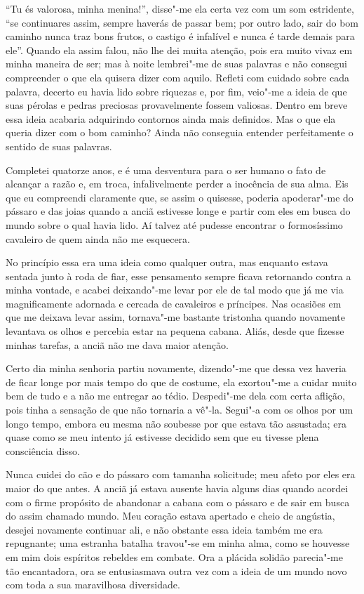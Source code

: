 ``Tu és valorosa, minha menina!'', disse"-me ela certa vez com um
som estridente, ``se continuares assim, sempre haverás de passar
bem; por outro lado, sair do bom caminho nunca traz bons frutos, o
castigo é infalível e nunca é tarde demais para ele''. Quando ela assim
falou, não lhe dei muita atenção, pois era muito vivaz em minha maneira
de ser; mas à noite lembrei"-me de suas palavras e não consegui
compreender o que ela quisera dizer com aquilo. Refleti com cuidado
sobre cada palavra, decerto eu havia lido sobre riquezas e, por fim,
veio"-me a ideia de que suas pérolas e pedras preciosas provavelmente
fossem valiosas. Dentro em breve essa ideia acabaria adquirindo
contornos ainda mais definidos. Mas o que ela queria dizer com o bom
caminho? Ainda não conseguia entender perfeitamente o sentido de suas
palavras.

 Completei quatorze anos, e é uma desventura para o ser humano o fato de
alcançar a razão e, em troca, infalivelmente perder a inocência de sua
alma. Eis que eu compreendi claramente que, se assim o quisesse,
poderia apoderar"-me do pássaro e das joias quando a anciã estivesse
longe e partir com eles em busca do mundo sobre o qual havia lido. Aí
talvez até pudesse encontrar o formosíssimo cavaleiro de quem ainda não
me esquecera.

 No princípio essa era uma ideia como qualquer outra, mas enquanto
estava sentada junto à roda de fiar, esse pensamento sempre ficava
retornando contra a minha vontade, e acabei deixando"-me levar por ele
de tal modo que já me via magnificamente adornada e cercada de
cavaleiros e príncipes. Nas ocasiões em que me deixava levar assim,
tornava"-me bastante tristonha quando novamente levantava os olhos e
percebia estar na pequena cabana. Aliás, desde que fizesse minhas
tarefas, a anciã não me dava maior atenção.

 Certo dia minha senhoria partiu novamente, dizendo"-me que dessa vez
haveria de ficar longe por mais tempo do que de costume, ela exortou"-me
a cuidar muito bem de tudo e a não me entregar ao tédio. Despedi"-me
dela com certa aflição, pois tinha a sensação de que não tornaria a
vê"-la. Segui"-a com os olhos por um longo tempo, embora eu mesma não
soubesse por que estava tão assustada; era quase como se meu intento já
estivesse decidido sem que eu tivesse plena consciência disso.

 Nunca cuidei do cão e do pássaro com tamanha solicitude; meu afeto por
eles era maior do que antes. A anciã já estava ausente havia alguns
dias quando acordei com o firme propósito de abandonar a cabana com o
pássaro e de sair em busca do assim chamado mundo. Meu coração estava
apertado e cheio de angústia, desejei novamente continuar ali, e não
obstante essa ideia também me era repugnante; uma estranha batalha
travou"-se em minha alma, como se houvesse em mim dois espíritos
rebeldes em combate. Ora a plácida solidão parecia"-me tão encantadora,
ora se entusiasmava outra vez com a ideia de um mundo novo com toda a
sua maravilhosa diversidade.


